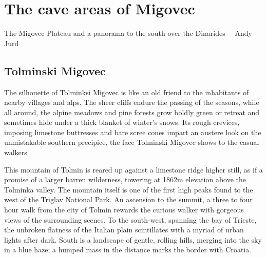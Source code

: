 \section{The cave areas of Migovec}

\begin{marginfigure}
\checkoddpage \ifoddpage \forcerectofloat \else \forceversofloat \fi
\centering
 \caption{The Migovec Plateau and a panorama to the south over the Dinarides ---Andy Jurd}
 \label{near sump}
\end{marginfigure}

\subsection{Tolminski Migovec}
The silhouette of Tolminksi Migovec is like an old friend to the inhabitants of nearby villages and alps. The sheer cliffs endure the passing of the seasons, while all around, the alpine meadows and pine forests grow boldly green or retreat and sometimes hide under a thick blanket of winter's snows. Its rough crevices, imposing limestone buttresses and bare scree cones impart an austere look on the unmistakable southern precipice, the face Tolminski Migovec shows to the casual walkers

This mountain of Tolmin is reared up against a limestone ridge higher still, as if a promise of a larger barren wilderness, towering at 1862m elevation above the Tolminka valley. The mountain itself is one of the first high peaks found to the west of the Triglav National Park. An ascension to the summit, a three to four hour walk from the city of Tolmin rewards the curious walker with gorgeous views of the surrounding scenes. To the south-west, spanning the bay of Trieste, the unbroken flatness of the Italian plain scintillates with a myriad of urban lights after dark. South is a landscape of gentle, rolling hills, merging into the sky in a blue haze; a humped mass in the distance marks the border with Croatia. 

 \begin{figure*}[b!]
 \checkoddpage \ifoddpage \forcerectofloat \else \forceversofloat \fi
\centering
  \label{winter panorama migovec}
 \end{figure*}

